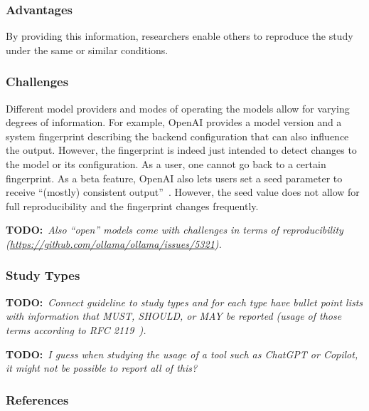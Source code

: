 \documentclass[11pt]{article}
\newcommand{\todo}[1]{{\textbf{TODO:}\ \textit{#1}}} %
\begin{document}
\subsubsection{Advantages}

By providing this information, researchers enable others to reproduce the study under the same or similar conditions.


\subsubsection{Challenges}

Different model providers and modes of operating the models allow for varying degrees of information.
For example, OpenAI provides a model version and a system fingerprint describing the backend configuration that can also influence the output.
However, the fingerprint is indeed just intended to detect changes to the model or its configuration.
As a user, one cannot go back to a certain fingerprint.
As a beta feature, OpenAI also lets users set a seed parameter to receive ``(mostly) consistent output''~\cite{OpenAI23}.
However, the seed value does not allow for full reproducibility and the fingerprint changes frequently. 

\todo{Also ``open'' models come with challenges in terms of reproducibility (\url{https://github.com/ollama/ollama/issues/5321}).}


\subsubsection{Study Types}

\todo{Connect guideline to study types and for each type have bullet point lists with information that MUST, SHOULD, or MAY be reported (usage of those terms according to RFC 2119~\cite{rfc2119}).}

\todo{I guess when studying the usage of a tool such as ChatGPT or Copilot, it might not be possible to report all of this?}


\subsubsection{References}



\end{document}
